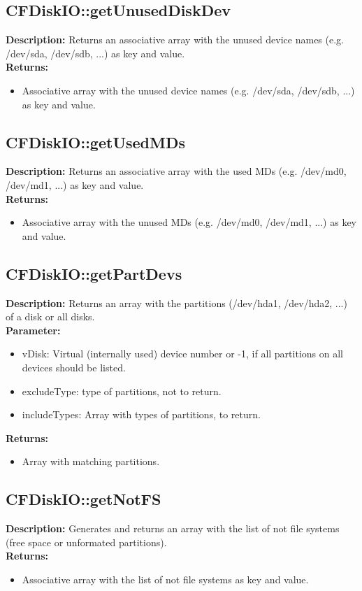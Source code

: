 \subsection{CFDiskIO::getUnusedDiskDev}
\textbf{Description:} Returns an associative array with the unused device names (e.g. /dev/sda, /dev/sdb, ...) as key and value.\\
\textbf{Returns:}
\begin{itemize}
\item Associative array with the unused device names (e.g. /dev/sda, /dev/sdb, ...) as key and value.
\end{itemize}

\subsection{CFDiskIO::getUsedMDs}
\textbf{Description:} Returns an associative array with the used MDs (e.g. /dev/md0, /dev/md1, ...) as key and value.\\
\textbf{Returns:}
\begin{itemize}
\item Associative array with the unused MDs (e.g. /dev/md0, /dev/md1, ...) as key and value.
\end{itemize}

\subsection{CFDiskIO::getPartDevs}
\textbf{Description:} Returns an array with the partitions (/dev/hda1, /dev/hda2, ...) of a disk or all disks.\\
\textbf{Parameter:}
\begin{itemize}
\item vDisk: Virtual (internally used) device number or -1, if all partitions on all devices should be listed.
\item excludeType: type of partitions, not to return.
\item includeTypes: Array with types of partitions, to return.
\end{itemize}
\textbf{Returns:}
\begin{itemize}
\item Array with matching partitions.
\end{itemize}

\subsection{CFDiskIO::getNotFS}
\textbf{Description:} Generates and returns an array with the list of not file systems (free space or unformated partitions).\\
\textbf{Returns:}
\begin{itemize}
\item Associative array with the list of not file systems as key and value.
\end{itemize}

